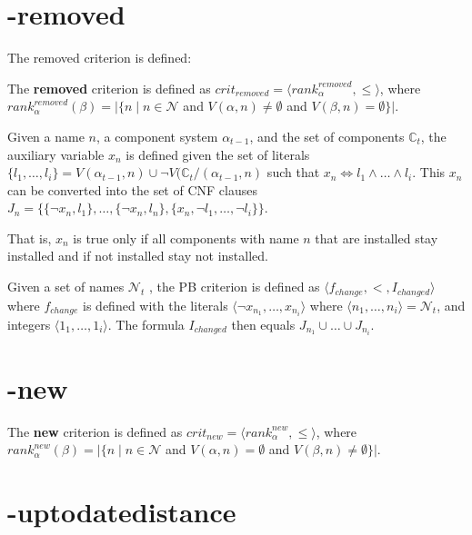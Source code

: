 \section{-removed}

The removed criterion is defined:
\begin{defs}
	The \textbf{removed} criterion is defined as $crit_{removed} = \langle rank^{removed}_{\alpha}, \leq \rangle$,
	where $rank^{removed}_{\alpha}(\beta) = |\{n \mid n \in \mathcal{N}$ and $V(\alpha,n) \neq \emptyset$ and $V(\beta,n) =\emptyset\}|$.
\end{defs}

\begin{defs}
Given a name $n$, a component system $\alpha_{t-1}$, and the set of components $\mathbb{C}_t$,
the auxiliary variable $x_n$ is defined given the set of literals $\{l_1,\ldots,l_i\} = V(\alpha_{t-1},n) \cup \neg V(\mathbb{C}_t / (\alpha_{t-1} ,n)$ 
such that $x_n \Leftrightarrow l_1 \wedge \ldots \wedge l_i$.
This $x_n$ can be converted into the set of CNF clauses $J_n = \{ \{\neg x_n,l_1\},\ldots, \{\neg x_n,l_n\}, \{x_n, \neg l_1,\ldots,\neg l_i\}\}$.
\end{defs}
That is, $x_n$ is true only if all components with name $n$ that are installed stay installed and if not installed stay not installed.

\begin{defs}
Given a set of names $\mathcal{N}_t$ , the PB criterion is defined as $\langle f_{change}, <, I_{changed} \rangle$ where 
$f_{change}$ is defined with the literals $\langle \neg x_{n_1},\ldots, x_{n_i}\rangle$ where $\langle n_1,\ldots, n_i \rangle = \mathcal{N}_t$, and integers $\langle 1_1,\ldots,1_i\rangle$.
The formula $I_{changed}$ then equals $J_{n_1} \cup \ldots \cup J_{n_i}$.
\end{defs}

\section{-new}
\begin{defs}
	The \textbf{new} criterion is defined as $crit_{new} = \langle rank^{new}_{\alpha}, \leq \rangle$,
	where $rank^{new}_{\alpha}(\beta) = |\{n \mid n \in \mathcal{N}$ and $V(\alpha,n) = \emptyset$ and $V(\beta,n) \neq \emptyset\}|$.
\end{defs}

\section{-uptodatedistance}

